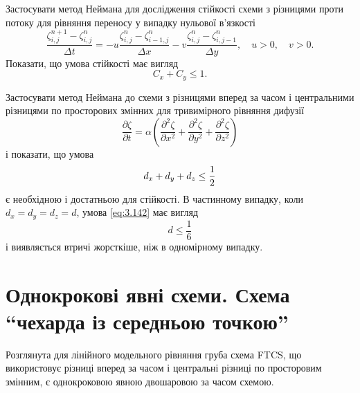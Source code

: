 \begin{exercise}
    Застосувати метод Неймана для дослідження стійкості схеми з різницями проти потоку для рівняння переносу у випадку нульової в'язкості
 	\begin{equation}
 	    \label{eq:3.139}
 	    \frac{\zeta_{i, j}^{n + 1} - \zeta_{i, j}^n}{\Delta t} = -u \frac{\zeta_{i, j}^n - \zeta_{i - 1, j}^n}{\Delta x} -v \frac{\zeta_{i, j}^n - \zeta_{i, j - 1}^n}{\Delta y}, \quad u > 0, \quad v > 0.
 	\end{equation}
    Показати, що умова стійкості має вигляд
 	\begin{equation}
 	    \label{eq:3.140}
 	    C_x + C_y \le 1.
 	\end{equation}
\end{exercise}

\begin{exercise}
    Застосувати метод Неймана до схеми з різницями вперед за часом і центральними різницями по просторових змінних для тривимірного рівняння дифузії
 	\begin{equation}
 	    \label{eq:3.141}
 	    \frac{\partial \zeta}{\partial t} = \alpha \left( \frac{\partial^2 \zeta}{\partial x^2} + \frac{\partial^2 \zeta}{\partial y^2} + \frac{\partial^2 \zeta}{\partial z^2} \right)
 	\end{equation}
    і показати, що умова
 	\begin{equation}
 	    \label{eq:3.142}
 	    d_x + d_y + d_z \le \frac{1}{2}
 	\end{equation}
    є необхідною і достатньою для стійкості. В частинному випадку, коли $d_x = d_y = d_z = d$, умова \eqref{eq:3.142} має вигляд
 	\begin{equation}
 	    \label{eq:3.143}
 	    d \le \frac{1}{6}
 	\end{equation}
    і виявляється втричі жорсткіше, ніж в одномірному випадку.
\end{exercise}

\section{Однокрокові явні схеми. Схема ``чехарда із середньою точкою''}

Розглянута для лінійного модельного рівняння груба схема FTCS, що використовує різниці вперед за часом і центральні різниці по просторовим змінним, є однокроковою явною двошаровою за часом схемою. 

